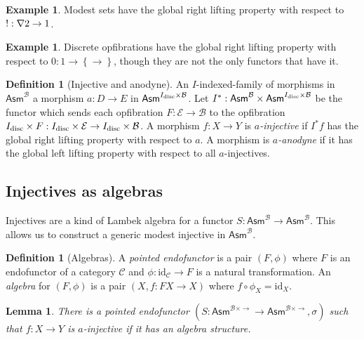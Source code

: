 \documentclass{amsart}
\theoremstyle{plain}
\newtheorem{lemma}[theorem]{Lemma}
\theoremstyle{definition}
\newtheorem{defin}[theorem]{Definition}
\newtheorem{example}[theorem]{Example}
\newcommand\cat\mathcal
\newcommand\set[1]{\left\{#1\right\}}
\newcommand\id{\mathrm{id}}
\newcommand\ri{^*}
\newcommand\Asm{\mathsf{Asm}}
\begin{document}
\begin{example} Modest sets have the global right lifting property with respect to $!:\nabla 2\to 1$. \end{example}

\begin{example} Discrete opfibrations have the global right lifting property with respect to $0:1\to \set\to$, though they are not the only functors that have it. \end{example}

\begin{defin}[Injective and anodyne] An $I$-indexed-family of morphisms in $\Asm^{\cat B}$ a morphism $a:D\to E$ in $\Asm^{I\disc\times\cat B}$. Let $I\ri:\Asm^{\cat B}\times \Asm^{I\disc\times \cat B}$ be the functor which sends each opfibration $F:\cat E\to \cat B$ to the opfibration $I\disc\times F:I\disc\times\cat E\to I\disc\times\cat B$. A morphism $f:X\to Y$ is \emph{$a$-injective} if $I\ri f$ has the global right lifting property with respect to $a$. A morphism is \emph{$a$-anodyne} if it has the global left lifting property with respect to all $a$-injectives. \end{defin}


\subsection{Injectives as algebras}\label{IAA}
Injectives are a kind of Lambek algebra for a functor $S:\Asm^{\cat B}\to \Asm^{\cat B}$. This allows us to construct a generic modest injective in $\Asm^{\cat B}$.

\begin{defin}[Algebras] A \emph{pointed endofunctor} is a pair $(F,\phi)$ where $F$ is an endofunctor of a category $\cat C$ and $\phi:\id_{\cat C}\to F$ is a natural transformation. An \emph{algebra} for $(F,\phi)$ is a pair $(X,f:FX\to X)$ where $f\circ \phi_X = \id_X$. \end{defin}

\begin{lemma} There is a pointed endofunctor $(S:\Asm^{\cat B\times \to}\to\Asm^{\cat B\times \to}, \sigma)$ such that $f:X\to Y$ is $a$-injective if it has an algebra structure. \end{lemma}
\end{document}
